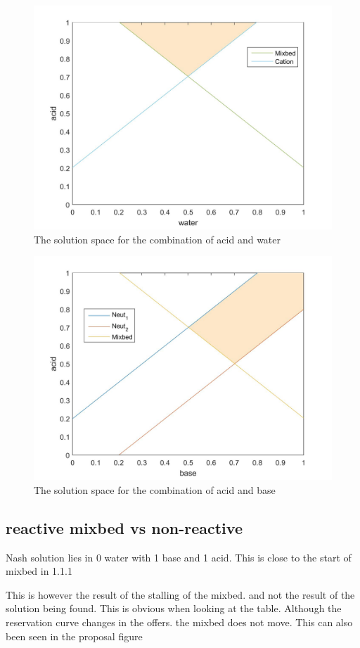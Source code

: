 \begin{figure}[h]
	\centering
	\includegraphics[width=0.7\linewidth]{img/reservationcurve_water_acid}
	\caption{The solution space for the combination of acid and water}
	\label{fig:reservationcurvewateracid}
\end{figure}
\begin{figure}[h]
	\centering
	\includegraphics[width=0.7\linewidth]{img/reservationcurve_base_acid}
	\caption{The solution space for the combination of acid and base}
	\label{fig:reservationcurvebaseacid}
\end{figure}


\subsection{reactive mixbed vs non-reactive}
Nash solution lies in 0 water with 1 base and 1 acid. This is close to the start of mixbed in 1.1.1

This is however the result of the stalling of the mixbed. and not the result of the solution being found. This is obvious when looking at the table. Although the reservation curve changes in the offers. the mixbed does not move. This can also been seen in the proposal figure



